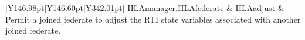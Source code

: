 \begin{landscape}
\begin{momtabletypeset}[8.00]
{{\begin{tabular}{|Y{146.98pt}|Y{146.60pt}|Y{342.01pt}|}
                    HLAmanager.\allowbreak{}HLAfederate                        & HLAadjust               & Permit a joined federate to adjust the RTI state variables associated with another joined federate.\allowbreak{}                                                                                                                                                                                                                                                                                                                                                                                                                                                                                                                                                                                                                                                                                                                                                                                                                                                                                                                                                                                                                                                                                                                                                                                                                                                                                                                                                                                                                                                     \\

\end{tabular}}}
\end{momtabletypeset}
\end{landscape}
